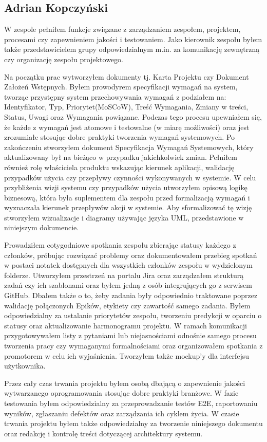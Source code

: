 \subsection{Adrian Kopczyński}
\par
W zespole pełniłem funkcje związane z zarządzaniem zespołem, projektem, procesami czy zapewnieniem jakości i testowaniem.
Jako kierownik zespołu byłem także przedstawicielem grupy odpowiedzialnym m.in. za komunikację zewnętrzną czy organizację zespołu projektowego.
\par
Na początku prac wytworzyłem dokumenty tj. Karta Projektu czy Dokument Założeń Wstępnych.
Byłem prowodyrem specyfikacji wymagań na system, tworząc przystępny system przechowywania wymagań z podziałem na: Identyfikator, Typ, Priorytet(MoSCoW), Treść Wymagania, Zmiany w treści, Status, Uwagi oraz Wymagania powiązane.
Podczas tego procesu upewniałem się, że każde z wymagań jest atomowe i testowalne (w miarę możliwości) oraz jest zrozumiałe stosując dobre praktyki tworzenia wymagań systemowych.
Po zakończeniu stworzyłem dokument Specyfikacja Wymagań Systemowych, który aktualizowany był na bieżąco w przypadku jakichkolwiek zmian.
Pełniłem również rolę właściciela produktu wskazując kierunek aplikacji, walidację przypadków użycia czy przepływy czynności wykonywanych w systemie.
W celu przybliżenia wizji systemu czy przypadków użycia utworzyłem opisową logikę biznesową, która była suplementem dla zespołu przed formalizacją wymagań i wyznaczała kierunek przepływów akcji w systemie.
Aby sformalizować tę wizję stworzyłem wizualizacje i diagramy używając języka UML, przedstawione w niniejszym dokumencie.
\par
Prowadziłem cotygodniowe spotkania zespołu zbierając statusy każdego z członków, próbując rozwiązać problemy oraz dokumentowałem przebieg spotkań w postaci notatek dostępnych dla wszystkich członków zespołu w wydzielonym folderze.
Utworzyłem przestrzeń na portalu Jira oraz zarządzałem strukturą zadań czy ich szablonami oraz byłem jedną z osób integrujących go z serwisem \gls{GitHub}.
Dbałem także o to, żeby zadania były odpowiednio traktowane poprzez walidację połączonych \gls{Epik}ów, etykiety czy zawartość samego zadania.
Byłem odpowiedzialny za ustalanie priorytetów zespołu, tworzeniu predykcji w oparciu o statusy oraz aktualizowanie harmonogramu projektu.
W ramach komunikacji przygotowywałem listy z pytaniami lub niejasnościami odnośnie samego procesu tworzenia pracy czy wymaganymi formalnościami oraz organizowałem spotkania z promotorem w celu ich wyjaśnienia.
Tworzyłem także \gls{mockup}'y dla interfejsu użytkownika.
\par
Przez cały czas trwania projektu byłem osobą dbającą o zapewnienie jakości wytwarzanego oprogramowania stosując dobre praktyki branżowe.
W fazie testowania byłem odpowiedzialny za przeprowadzanie testów \gls{E2E}, raportowaniu wyników, zgłaszaniu defektów oraz zarządzania ich cyklem życia.
W czasie trwania projektu byłem także odpowiedzialny za tworzenie niniejszego dokumentu oraz redakcję i kontrolę treści dotyczącej architektury systemu.

